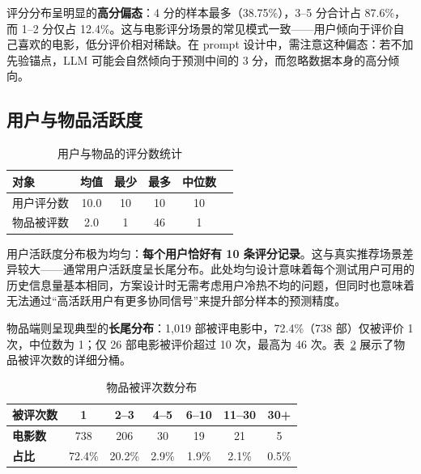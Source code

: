 \documentclass[UTF8,a4paper,10pt]{ctexart}
\begin{document}
评分分布呈明显的\textbf{高分偏态}：4 分的样本最多（38.75\%），3--5 分合计占 87.6\%，而 1--2 分仅占 12.4\%。这与电影评分场景的常见模式一致——用户倾向于评价自己喜欢的电影，低分评价相对稀缺。在 prompt 设计中，需注意这种偏态：若不加先验锚点，LLM 可能会自然倾向于预测中间的 3 分，而忽略数据本身的高分倾向。

\subsection{用户与物品活跃度}

\begin{table}[htbp]
    \centering
    \setlength{\tabcolsep}{20pt}
    \caption{用户与物品的评分数统计}
    \label{tab:activity}
    \begin{tabular}{@{}lccccc@{}}
        \toprule
        \textbf{对象} & \textbf{均值} & \textbf{最少} & \textbf{最多} & \textbf{中位数} \\
        \midrule
        用户评分数 & 10.0 & 10 & 10 & 10 \\
        物品被评数 & 2.0  & 1  & 46 & 1 \\
        \bottomrule
    \end{tabular}
\end{table}

用户活跃度分布极为均匀：\textbf{每个用户恰好有 10 条评分记录}。这与真实推荐场景差异较大——通常用户活跃度呈长尾分布。此处均匀设计意味着每个测试用户可用的历史信息量基本相同，方案设计时无需考虑用户冷热不均的问题，但同时也意味着无法通过“高活跃用户有更多协同信号”来提升部分样本的预测精度。

物品端则呈现典型的\textbf{长尾分布}：1,019 部被评电影中，72.4\%（738 部）仅被评价 1 次，中位数为 1；仅 26 部电影被评价超过 10 次，最高为 46 次。表~\ref{tab:movie_buckets} 展示了物品被评次数的详细分桶。

\begin{table}[htbp]
    \centering
    \setlength{\tabcolsep}{18pt}
    \caption{物品被评次数分布}
    \label{tab:movie_buckets}
    \begin{tabular}{@{}lcccccc@{}}
        \toprule
        \textbf{被评次数} & 1 & 2--3 & 4--5 & 6--10 & 11--30 & 30+ \\
        \midrule
        \textbf{电影数} & 738 & 206 & 30 & 19 & 21 & 5 \\
        \textbf{占比} & 72.4\% & 20.2\% & 2.9\% & 1.9\% & 2.1\% & 0.5\% \\
        \bottomrule
    \end{tabular}
\end{table}
\end{document}
